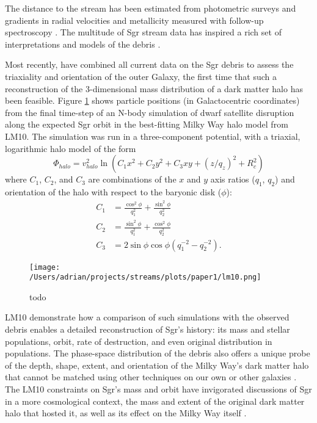 \documentclass{emulateapj}
\begin{document}
The distance to the stream has been estimated from photometric surveys
\citep[e.g.,][]{martinezdelgado04} and gradients in radial
velocities and metallicity measured with follow-up spectroscopy
\citep[e.g.,][]{majewski04, vivas05, bellazzini06, chou07,
  chou10, keller10, carlin12}. The multitude of Sgr stream data
has inspired a rich set of interpretations and models of the debris
\citep[e.g.,][]{johnston99b, helmi04, law05, fellhauer06,
  law10}.

Most recently, \citet[][hereafter LM10]{law10} have combined all
current data on the Sgr debris to assess the triaxiality and
orientation of the outer Galaxy, the first time that such a
reconstruction of the 3-dimensional mass distribution of a dark matter
halo has been feasible. Figure \ref{fig:lm10} shows particle positions
(in Galactocentric coordinates) from the final time-step of an N-body
simulation of dwarf satellite disruption along the expected Sgr orbit
in the best-fitting Milky Way halo model from LM10. The simulation was
run in a three-component potential, with a triaxial, logarithmic halo
model of the form
\begin{equation}
  \Phi_{halo} = v_{halo}^2 \ln(C_1 x^2 + C_2 y^2 + C_3 xy + (z/q_z)^2 + R_c^2)
\end{equation}
where $C_1$, $C_2$, and $C_3$ are combinations of the $x$ and $y$ axis
ratios ($q_1$, $q_2$) and orientation of the halo with respect to the
baryonic disk ($\phi$):
\begin{align}
  C_1 &= \frac{\cos^2\phi}{q_1^2} + \frac{\sin^2\phi}{q_2^2}\\
  C_2 &= \frac{\sin^2\phi}{q_1^2} + \frac{\cos^2\phi}{q_2^2}\\
  C_3 &= 2\sin\phi\cos\phi \left(q_1^{-2} - q_2^{-2}\right).
\end{align}

\begin{figure}[h]
\begin{center}
\texttt{[image: /Users/adrian/projects/streams/plots/paper1/lm10.png]}
\caption{ todo }\label{fig:lm10}
\end{center}
\end{figure}

LM10 demonstrate how a comparison of such simulations with the
observed debris enables a detailed reconstruction of Sgr's history:
its mass and stellar populations, orbit, rate of destruction, and even
original distribution in populations. The phase-space distribution of
the debris also offers a unique probe of the depth, shape, extent, and
orientation of the Milky Way's dark matter halo that cannot be matched
using other techniques on our own or other galaxies
\citep[e.g.,][]{ibata01}. The LM10 constraints on Sgr's mass and orbit
have invigorated discussions of Sgr in a more cosmological context,
the mass and extent of the original dark matter halo that hosted it,
as well as its effect on the Milky Way itself
\citep{bailin03,purcell11,micheldansac11,gomez12}.
\end{document}
